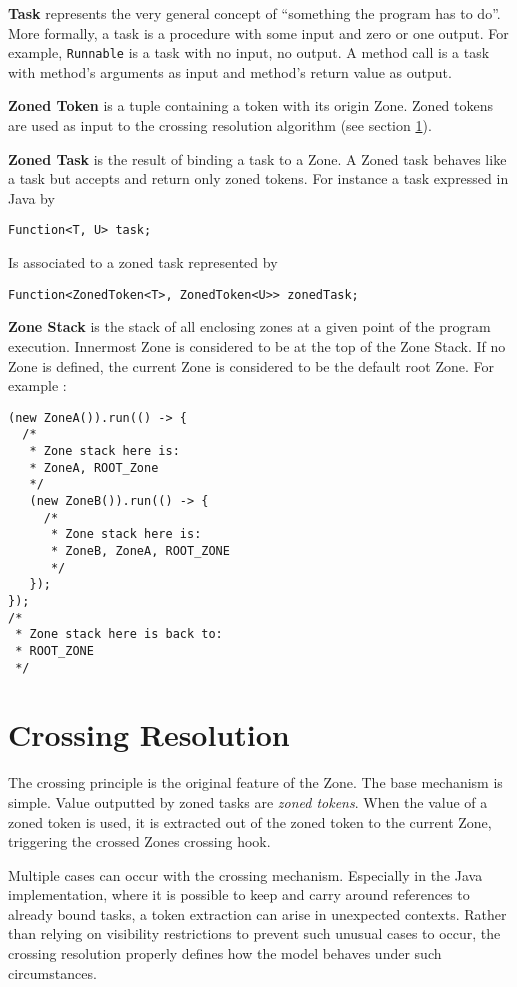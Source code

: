 \textbf{Task} represents the very general concept of ``something the program has to do''. More formally, a task is a procedure with some input and zero or one output. For example, \lstinline{Runnable} is a task with no input, no output. A method call is a task with method's arguments as input and method's return value as output.

\textbf{Zoned Token} is a tuple containing a token with its origin Zone. Zoned tokens are used as input to the crossing resolution algorithm (see section \ref{sec:cross-res}).

\textbf{Zoned Task} is the result of binding a task to a Zone. A Zoned task behaves like a task but accepts and return only zoned tokens. For instance a task expressed in Java by
\begin{lstlisting}
Function<T, U> task;
\end{lstlisting}
Is associated to a zoned task represented by
\begin{lstlisting}
Function<ZonedToken<T>, ZonedToken<U>> zonedTask;
\end{lstlisting}

\textbf{Zone Stack} is the stack of all enclosing zones at a given point of the program execution. Innermost Zone is considered to be at the top of the Zone Stack. If no Zone is defined, the current Zone is considered to be the default root Zone. For example :

\begin{lstlisting}
(new ZoneA()).run(() -> {
  /*
   * Zone stack here is:
   * ZoneA, ROOT_Zone
   */
   (new ZoneB()).run(() -> {
     /*
      * Zone stack here is:
      * ZoneB, ZoneA, ROOT_ZONE
      */
   });
});
/*
 * Zone stack here is back to:
 * ROOT_ZONE
 */
\end{lstlisting}

\section{Crossing Resolution}
\label{sec:cross-res}

The crossing principle is the original feature of the Zone. The base mechanism is simple. Value outputted by zoned tasks are \emph{zoned tokens}. When the value of a zoned token is used, it is extracted out of the zoned token to the current Zone, triggering the crossed Zones crossing hook.

Multiple cases can occur with the crossing mechanism. Especially in the Java implementation, where it is possible to keep and carry around references to already bound tasks, a token extraction can arise in unexpected contexts. Rather than relying on visibility restrictions to prevent such unusual cases to occur, the crossing resolution properly defines how the model behaves under such circumstances.

